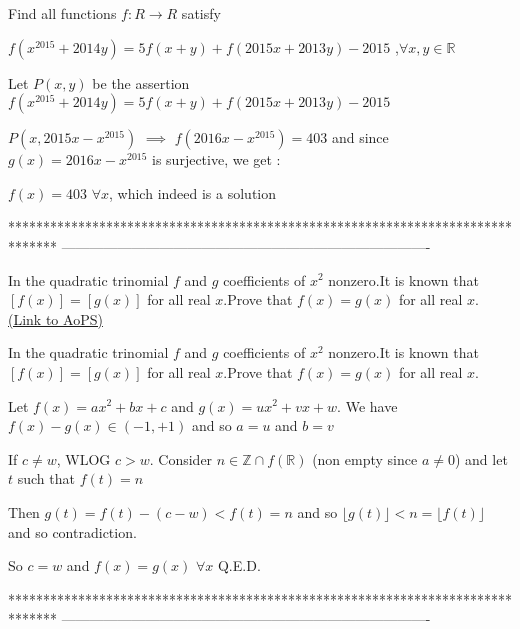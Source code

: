 \begin{solution}
	\begin{tcolorbox}Find all functions $ f: R \longrightarrow R$ satisfy

$f\left ( x^{2015}+2014y \right )=5f\left ( x+y \right )+f\left ( 2015x+2013y \right ) -2015$         ,$\forall x,y\in \mathbb{R}$\end{tcolorbox}
Let $P(x,y)$ be the assertion $f(x^{2015}+2014y)=5f(x+y)+f(2015x+2013y)-2015$

$P(x,2015x-x^{2015})$ $\implies$ $f(2016x-x^{2015})=403$ and since $g(x)=2016x-x^{2015}$ is surjective, we get :

$\boxed{f(x)=403}$ $\forall x$, which indeed is a solution
\end{solution}
*******************************************************************************
-------------------------------------------------------------------------------

\begin{problem}
	In the quadratic trinomial $f$ and $g$ coefficients of $x^2$ nonzero.It is known that $[f(x)]=[g(x)]$ for all real $x$.Prove that $f(x)=g(x)$ for all real $x$.
	\flushright \href{https://artofproblemsolving.com/community/c6h590406}{(Link to AoPS)}
\end{problem}



\begin{solution}
	\begin{tcolorbox}In the quadratic trinomial $f$ and $g$ coefficients of $x^2$ nonzero.It is known that $[f(x)]=[g(x)]$ for all real $x$.Prove that $f(x)=g(x)$ for all real $x$.\end{tcolorbox}
Let $f(x)=ax^2+bx+c$ and $g(x)=ux^2+vx+w$. We have $f(x)-g(x)\in(-1,+1)$ and so $a=u$ and $b=v$

If $c\ne w$, WLOG $c>w$. Consider $n\in\mathbb Z\cap f(\mathbb R)$ (non empty since $a\ne 0$) and let $t$ such that $f(t)=n$

Then $g(t)=f(t)-(c-w)<f(t)=n$ and so $\lfloor g(t)\rfloor<n=\lfloor f(t)\rfloor$ and so contradiction.

So $c=w$ and $f(x)=g(x)$ $\forall x$
Q.E.D.
\end{solution}
*******************************************************************************
-------------------------------------------------------------------------------

